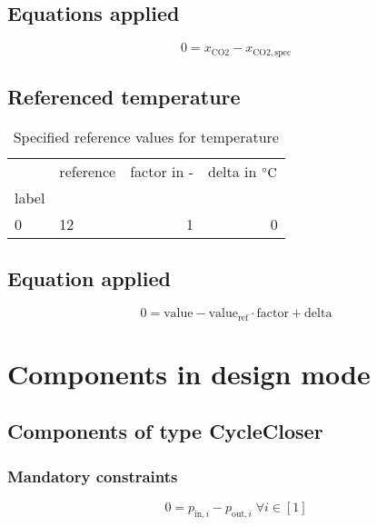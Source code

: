 \documentclass[]{article}
\begin{document}
\subsection{Equations applied}

\begin{equation}
\label{eq:Connection_CO2}
0 = x_\mathrm{CO2} - x_\mathrm{CO2,spec}
\end{equation}

\subsection{Referenced temperature}

\begin{table}[H]
\centering
\caption{Specified reference values for temperature}
\begin{tabular}{llrr}
\toprule
{} & reference &  factor in - &  delta in $\unit[]{^\circ C}$ \\
label &           &              &                               \\
\midrule
0     &        12 &            1 &                             0 \\
\bottomrule
\end{tabular}
\end{table}
\subsection{Equation applied}

\begin{equation}
\label{eq:Connection_ref}
0 = \text{value} - \text{value}_\mathrm{ref} \cdot \mathrm{factor} + \text{delta}
\end{equation}

\section{Components in design mode}

\subsection{Components of type CycleCloser}

\subsubsection{Mandatory constraints}

\begin{equation}
\label{eq:CycleCloser_pressure_equality_constraints}
0=p_{\mathrm{in,}i}-p_{\mathrm{out,}i}\; \forall i \in [1]
\end{equation}
\end{document}
